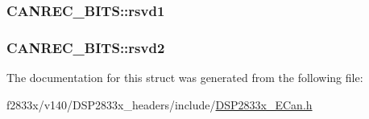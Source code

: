 \subsubsection[{rsvd1}]{ C\+A\+N\+R\+E\+C\+\_\+\+B\+I\+T\+S\+::rsvd1}\label{struct_c_a_n_r_e_c___b_i_t_s_af00676144a2449b6922a0beb1f5816d0}
\hypertarget{struct_c_a_n_r_e_c___b_i_t_s_af2d46b927519f1fe451008da6ff215c1}{}
\subsubsection[{rsvd2}]{ C\+A\+N\+R\+E\+C\+\_\+\+B\+I\+T\+S\+::rsvd2}\label{struct_c_a_n_r_e_c___b_i_t_s_af2d46b927519f1fe451008da6ff215c1}


The documentation for this struct was generated from the following file\+:\begin{DoxyCompactItemize}
\item 
f2833x/v140/\+D\+S\+P2833x\+\_\+headers/include/\hyperlink{_d_s_p2833x___e_can_8h}{D\+S\+P2833x\+\_\+\+E\+Can.\+h}\end{DoxyCompactItemize}
